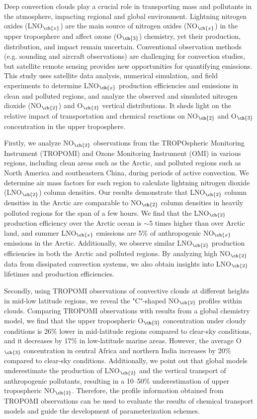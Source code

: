 {
Deep convection clouds play a crucial role in transporting mass and pollutants in the atmosphere, impacting regional and global environment.
Lightning nitrogen oxides (LNO$_{\ch{x}}$) are the main source of nitrogen oxides (NO$_{\ch{x}}$) in the upper troposphere
and affect ozone (O$_{\ch{3}}$) chemistry, yet their production, distribution, and impact remain uncertain.
Conventional observation methods (e.g. sounding and aircraft observations) are challenging for convection studies,
but satellite remote sensing provides new opportunities for quantifying emissions.
This study uses satellite data analysis, numerical simulation, and field experiments to determine LNO$_{\ch{x}}$ production efficiencies and emissions in clean and polluted regions,
and analyze the observed and simulated nitrogen dioxide (NO$_{\ch{2}}$) and O$_{\ch{3}}$ vertical distributions.
It sheds light on the relative impact of transportation and chemical reactions on NO$_{\ch{2}}$ and O$_{\ch{3}}$ concentration in the upper troposphere.

Firstly, we analyze NO$_{\ch{2}}$ observations from the TROPOspheric Monitoring Instrument (TROPOMI) and
Ozone Monitoring Instrument (OMI) in various regions, including clean areas such as the Arctic, and polluted regions such as North America and southeastern China, during periods of active convection.
We determine air mass factors for each region to calculate lightning nitrogen dioxide (LNO$_{\ch{2}}$) column densities.
Our results demonstrate that LNO$_{\ch{2}}$ column densities in the Arctic are comparable to NO$_{\ch{2}}$ column densities in heavily polluted regions for the span of a few hours.
We find that the LNO$_{\ch{2}}$ production efficiency over the Arctic ocean is $\sim$5 times higher than over Arctic land, and summer LNO$_{\ch{x}}$ emissions are 5\% of anthropogenic NO$_{\ch{x}}$ emissions in the Arctic.
Additionally, we observe similar LNO$_{\ch{2}}$ production efficiencies in both the Arctic and polluted regions.
By analyzing high NO$_{\ch{2}}$ data from dissipated convection systems, we also obtain insights into LNO$_{\ch{2}}$ lifetimes and production efficiencies.

Secondly, using TROPOMI observations of convective clouds at different heights in mid-low latitude regions, we reveal the "C"-shaped NO$_{\ch{2}}$ profiles within clouds.
Comparing TROPOMI observations with results from a global chemistry model, we find that the upper tropospheric O$_{\ch{3}}$ concentration under cloudy conditions is 26\% lower in mid-latitude regions compared to clear-sky conditions, and it decreases by 17\% in low-latitude marine areas.
However, the average O$_{\ch{3}}$ concentration in central Africa and northern India increases by 20\% compared to clear-sky conditions.
Additionally, we point out that global models underestimate the production of LNO$_{\ch{2}}$ and the vertical transport of anthropogenic pollutants, resulting in a 10--50\% underestimation of upper tropospheric NO$_{\ch{2}}$.
Therefore, the profile information obtained from TROPOMI observations can be used to evaluate the results of chemical transport models and guide the development of parameterization schemes.

}

